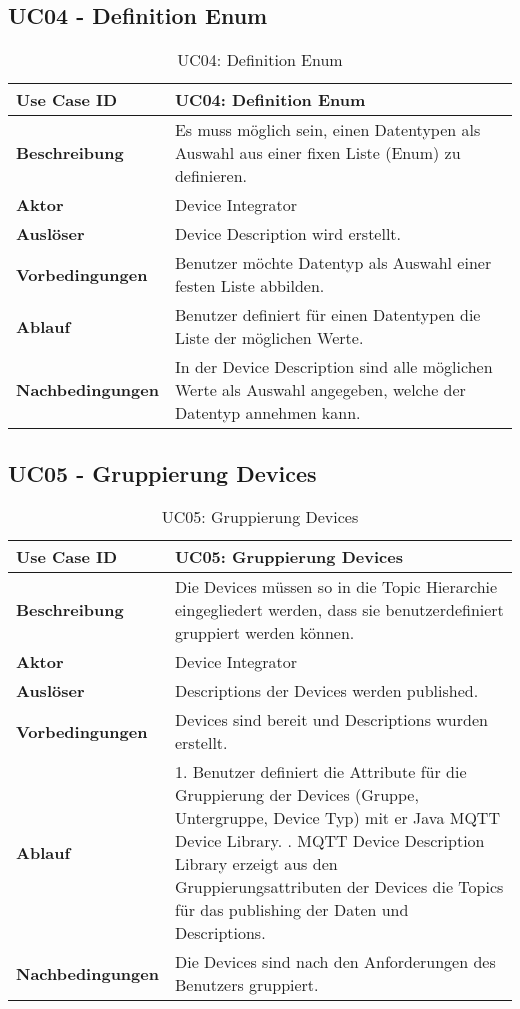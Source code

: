 \subsection{UC04 - Definition Enum}
\begin{table}[H]
\begin{tabularx}{\textwidth}{|l|X|}

 \hline
 {\bf Use Case ID }    & UC04: Definition Enum \\  \hline
 {\bf Beschreibung }   & Es muss möglich sein, einen Datentypen als Auswahl aus einer fixen Liste (Enum) zu definieren. \\ \hline
 {\bf Aktor }          & Device Integrator \\ \hline
 {\bf Auslöser }       & Device Description wird erstellt. \\ \hline
 {\bf Vorbedingungen } & Benutzer möchte Datentyp als Auswahl einer festen Liste abbilden. \\ \hline
 {\bf Ablauf }         & Benutzer definiert für einen Datentypen die Liste der möglichen Werte. \\ \hline
 {\bf Nachbedingungen} & In der Device Description sind alle möglichen Werte als Auswahl angegeben, welche der Datentyp annehmen kann.\\ \hline
  
\end{tabularx}
\caption{UC04: Definition Enum}
\end{table}

\subsection{UC05 - Gruppierung Devices}

\begin{table}[H]
\begin{tabularx}{\textwidth}{|l|X|}

 \hline
 {\bf Use Case ID }    & UC05: Gruppierung Devices \\  \hline
 {\bf Beschreibung }   & Die Devices müssen so in die Topic Hierarchie eingegliedert werden, dass sie benutzerdefiniert gruppiert werden können. \\ \hline
 {\bf Aktor }          & Device Integrator \\ \hline
 {\bf Auslöser }       & Descriptions der Devices werden published. \\ \hline
 {\bf Vorbedingungen } & Devices sind bereit und Descriptions wurden erstellt. \\ \hline
 {\bf Ablauf }         & 
  1. Benutzer definiert die Attribute für die Gruppierung der Devices (Gruppe, Untergruppe, Device Typ) mit er Java MQTT Device Library. \newline
  2. MQTT Device Description Library erzeigt aus den Gruppierungsattributen der Devices die Topics für das publishing der Daten und Descriptions. \\ \hline
 {\bf Nachbedingungen} & Die Devices sind nach den Anforderungen des Benutzers gruppiert. \\ \hline
  
\end{tabularx}
\caption{UC05: Gruppierung Devices}
\end{table}

